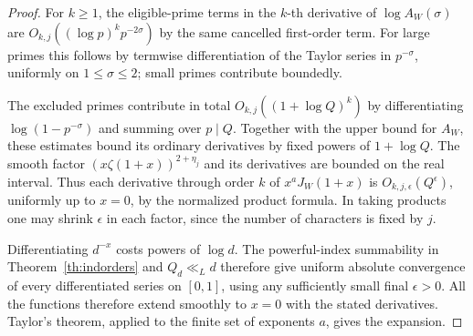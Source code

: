 \begin{proof}
For $k\ge1$, the eligible-prime terms in the $k$-th derivative of $\log A_W(\sigma)$ are $O_{k,j}((\log p)^k p^{-2\sigma})$ by the same cancelled first-order term. For large primes this follows by termwise differentiation of the Taylor series in $p^{-\sigma}$, uniformly on $1\le\sigma\le2$; small primes contribute boundedly. 

The excluded primes contribute in total $O_{k,j}((1+\log Q)^k)$ by differentiating $\log(1-p^{-\sigma})$ and summing over $p\mid Q$. Together with the upper bound for $A_W$, these estimates bound its ordinary derivatives by fixed powers of $1+\log Q$. The smooth factor $(x\zeta(1+x))^{2+\eta_j}$ and its derivatives are bounded on the real interval. Thus each derivative through order $k$ of $x^aJ_W(1+x)$ is $O_{k,j,\epsilon}(Q^\epsilon)$, uniformly up to $x=0$, by the normalized product formula. In taking products one may shrink $\epsilon$ in each factor, since the number of characters is fixed by $j$.

Differentiating $d^{-x}$ costs powers of $\log d$. The powerful-index summability in Theorem~\ref{th:indorders} and $Q_d\ll_L d$ therefore give uniform absolute convergence of every differentiated series on $[0,1]$, using any sufficiently small final $\epsilon>0$. All the functions therefore extend smoothly to $x=0$ with the
stated derivatives. Taylor's theorem, applied to the finite set
of exponents $a$, gives the expansion.
\end{proof}

